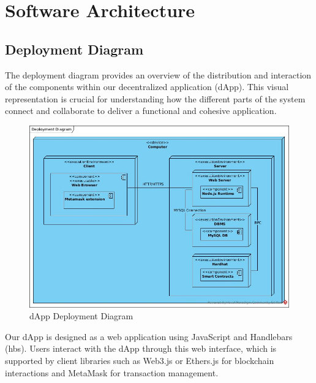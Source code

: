 \documentclass[main.tex]{subfiles}
\begin{document}
\section{Software Architecture}\label{sec:software_architecture}

\subsection{Deployment Diagram}

The deployment diagram provides an overview of the distribution and interaction of the components within our decentralized application (dApp). 
This visual representation is crucial for understanding how the different parts of the system connect and collaborate to deliver a functional and cohesive application.\\

\begin{figure}[htbp] %
    \centering %
    \includegraphics[width=1\textwidth]{src/diagrams/Deployment Diagram.jpg} %
    \caption{dApp Deployment Diagram} %
    \label{fig:deployDiag} %
\end{figure}

Our dApp is designed as a web application using JavaScript and Handlebars (hbs). Users interact with the dApp through this web interface, which is supported by client 
libraries such as Web3.js or Ethers.js for blockchain interactions and MetaMask for transaction management.\\
\end{document}
